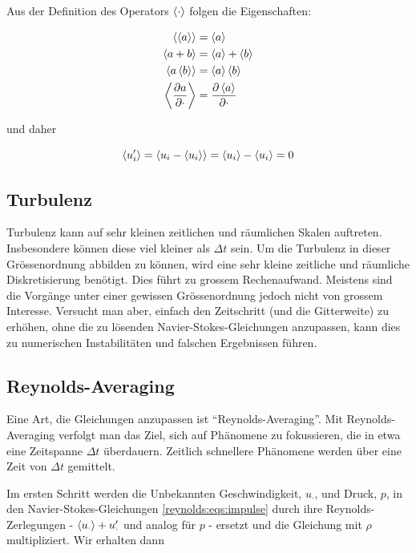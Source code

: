 Aus der Definition des Operators $\left\langle \cdot \right\rangle$ folgen die Eigenschaften:

\begin{align}
    \left\langle \left\langle a \right\rangle \right\rangle &= \left\langle a \right\rangle \\
    \left\langle a + b \right\rangle &= \left\langle a \right\rangle + \left\langle b \right\rangle \\
    \left\langle a \left\langle b \right\rangle \right\rangle &= \left\langle a \right\rangle \left\langle b \right\rangle \\
    \left\langle \frac{\partial a}{\partial \cdot} \right\rangle &= \frac{\partial \left\langle a \right\rangle}{\partial \cdot}
\end{align}

und daher

\begin{equation}
    \label{reynolds:eqs:trans-cancel}
    \left\langle u_i' \right\rangle = \left\langle u_i - \left\langle u_i \right\rangle \right\rangle = \left\langle u_i \right\rangle - \left\langle u_i \right\rangle = 0
\end{equation}

\subsection{Turbulenz}

Turbulenz kann auf sehr kleinen zeitlichen und räumlichen Skalen auftreten.
Insbesondere können diese viel kleiner als $\Delta t$ sein. Um die Turbulenz in dieser
Grössenordnung abbilden zu können, wird eine sehr kleine zeitliche und räumliche Diskretisierung
benötigt. Dies führt zu grossem Rechenaufwand. Meistens sind die Vorgänge unter
einer gewissen Grössenordnung jedoch nicht von grossem Interesse. Versucht man aber, einfach den Zeitschritt
(und die Gitterweite) zu erhöhen, ohne die zu lösenden Navier-Stokes-Gleichungen
anzupassen, kann dies zu numerischen Instabilitäten und falschen Ergebnissen führen.

\subsection{Reynolds-Averaging}
Eine Art, die Gleichungen anzupassen ist ``Reynolds-Averaging''. Mit Reynolds-Averaging verfolgt
man das Ziel, sich auf Phänomene zu fokussieren, die in etwa eine Zeitspanne $\Delta t$ überdauern.
Zeitlich schnellere Phänomene werden über eine Zeit von $\Delta t$ gemittelt.

Im ersten Schritt werden die Unbekannten Geschwindigkeit, $u_\cdot$, und Druck, $p$, in den Navier-Stokes-Gleichungen
\ref{reynolds:eqs:impulse} durch ihre Reynolds-Zerlegungen - $\left\langle u_\cdot \right\rangle + u_\cdot'$ und analog für $p$ - ersetzt und die Gleichung
mit $\rho$ multipliziert. Wir erhalten dann

